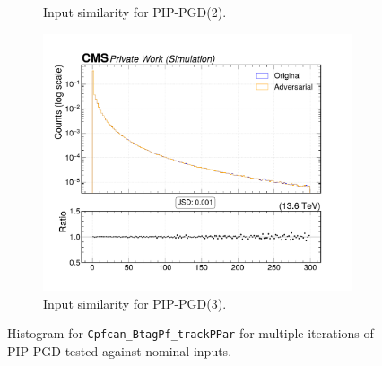 \begin{figure}[htbp]
\begin{subfigure}[t]{0.32\textwidth}
    \caption*{Input similarity for PIP-PGD(2).}
  \end{subfigure}\hfill
  \begin{subfigure}[t]{0.32\textwidth}
    \includegraphics[width=\linewidth]{media/output/features/compare/combined_it_3/cmp_cpf_arr_Cpfcan_BtagPf_trackPPar.pdf}
    \caption*{Input similarity for PIP-PGD(3).}
  \end{subfigure}

  \caption*{Histogram for \texttt{Cpfcan\_BtagPf\_trackPPar} for multiple iterations of PIP-PGD tested against nominal inputs.}
  \label{fig:combined_input_Cpfcan_BtagPf_trackPPar}
\end{figure}

